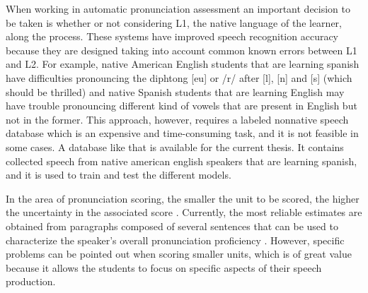 When working in automatic pronunciation assessment an important decision to be taken is
whether or not considering L1, the native language of the learner, along the process. These
systems have improved speech recognition accuracy because they are designed
taking into account common known errors between L1 and L2. For example, native American English
students that are learning spanish have difficulties pronouncing the diphtong [eu] or
/r/ after [l], [n] and [s] (which should be thrilled) and native Spanish students
that are learning English may have trouble pronouncing
different kind of vowels that are present in English
but not in the former. This approach, however, requires a labeled nonnative speech database
which is an expensive and time-consuming task, and
it is not feasible in some cases.
A database like that
is available
for the current thesis.
It contains collected
speech from native american english speakers that are learning
spanish, and it is used to train and test the different models.




In the area of pronunciation scoring, the smaller the unit to be scored, the higher the
uncertainty in the associated score \cite{pronunciation_scoring_phone_segments_instruction}.
Currently, the most reliable estimates are obtained from paragraphs composed of several
sentences that can be used to characterize the speaker's overall pronunciation
proficiency \cite{main}. However, specific problems can be pointed out
when scoring smaller units, which is of great value because it allows the students to focus
on specific aspects of their speech production.


